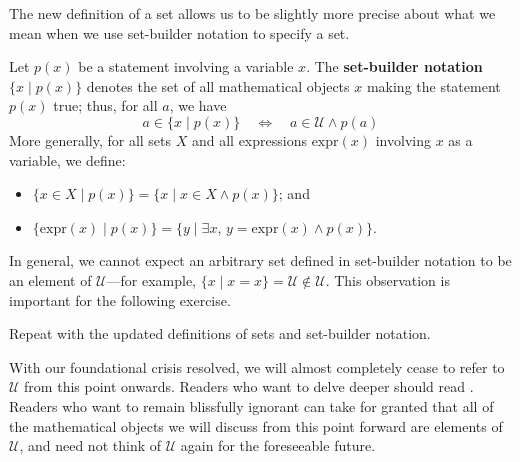 The new definition of a set allows us to be slightly more precise about what we mean when we use set-builder notation to specify a set.

\begin{definition}
\label{defSetBuilderNotation}
Let $p(x)$ be a statement involving a variable $x$. The \textbf{set-builder notation} $\{ x \mid p(x) \}$ denotes the set of all mathematical objects $x$ making the statement $p(x)$ true; thus, for all $a$, we have
\[ a \in \{ x \mid p(x) \} \quad \Leftrightarrow \quad a \in \mathcal{U} \wedge p(a) \]
More generally, for all sets $X$ and all expressions $\mathrm{expr}(x)$ involving $x$ as a variable, we define:
\begin{itemize}
\item $\{ x \in X \mid p(x) \} = \{ x \mid x \in X \wedge p(x) \}$; and
\item $\{ \mathrm{expr}(x) \mid p(x) \} = \{ y \mid \exists x,\, y=\mathrm{expr}(x) \wedge p(x) \}$.
\end{itemize}
\end{definition}

In general, we cannot expect an arbitrary set defined in set-builder notation to be an element of $\mathcal{U}$---for example, $\{ x \mid x=x \} = \mathcal{U} \not\in \mathcal{U}$. This observation is important for the following exercise.

\begin{exercise}
Repeat  with the updated definitions of sets and set-builder notation.
%
\end{exercise}

With our foundational crisis resolved, we will almost completely cease to refer to $\mathcal{U}$ from this point onwards. Readers who want to delve deeper should read . Readers who want to remain blissfully ignorant can take for granted that all of the mathematical objects we will discuss from this point forward are elements of $\mathcal{U}$, and need not think of $\mathcal{U}$ again for the foreseeable future.

